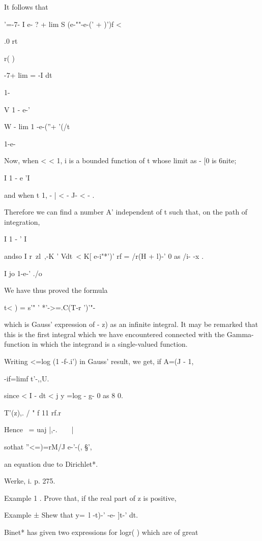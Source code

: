 It follows that

 '=-7- I e- ? + lim S (e-""-e-(' + )')f <

.0 rt%

r( )

-7+ lim = -I dt

1-

V 1 - e-'

W - lim 1 -e-(''+ '(/t

1-e-

Now, when < < 1, i is a bounded function of t whose limit as - [0 is
6nite;

I 1 - e 'I

and when t 1, - | < - J- < - .

Therefore we can find a number A' independent of t such that, on the
path of integration,

I 1 - ' I

andso I r\ zl~,-K ' Vdt\ < K[ e-i"*')' rf = /r(H + l)-' 0 as /i- -x .

I jo 1-e-' ./o

We have thus proved the formula

t< ) = s'" ' *'->=.C(T-r ')'"-

which is Gauss' expression of - z) as an infinite integral. It may be
remarked that this is the first integral which we have encountered
connected with the Gamma-function in which the integrand is a
single-valued function.

Writing <=log (1 -f-.i') in Gauss' result, we get, if A=(J - 1,

 -if=limf t'-,,U.

since < I - dt < j y =log - g- 0 as 8 0.

T'(z),. / " f 11 rf.r

Hence \ = uaj |,-.\ \ \ \ |\,

sothat ''<=)=rM/J e-'-(, §',

an equation due to Dirichlet*.

Werke, i. p. 275.

%
%

Example 1 . Prove that, if the real part of z is positive,

Example ± Shew that y=\ l -t)-' -e- ]t-' dt. 


Binet* has given two expressions for logr( ) which are of
great


